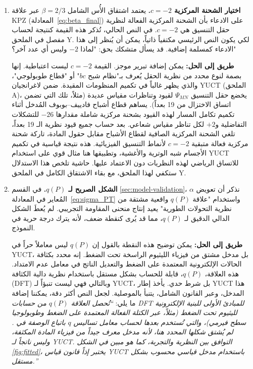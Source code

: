 \documentclass[12pt,a4paper]{article}
\theoremstyle{remark}
\begin{document}
	\begin{enumerate}
		\item \textbf{اختيار الشحنة المركزية \(c = -2\).} يعتمد اشتقاق الأُس الشامل \(\beta = 2/3\) عبر علاقة KPZ (المعادلة~\ref{eq:beta_final}) على الادعاء بأن الشحنة المركزية الفعالة لنظرية حقل التنسيق هي \(c = -2\). في النص الحالي، تُذكر هذه القيمة كنتيجة لحساب مفصل في الملحق Y. لكي يكون النص الرئيسي مكتفياً ذاتياً، يمكن أن يُنظر إلى هذا الادعاء كمسلمة إضافية. قد يسأل متشكك بحق: "لماذا \(-2\) وليس أي عدد آخر؟"
		
		\textbf{طريق إلى الحل:} يمكن إضافة تبرير موجز. القيمة \(c = -2\) ليست اعتباطية. إنها بصمة لنوع محدد من نظرية الحقل يُعرف بـ"نظام شبح \(bc\)" أو "قطاع طوبولوجي"، والذي يظهر غالباً في تكميم المنظومات المقيدة. ضمن لاغرانجيان YUCT (الملحق A)، يخضع حقل التنسيق \(\Psi_{MN}\) لقيود وتناظرات مقياس عديدة (مثلاً، تلك التي تضمن اتساق الاختزال من 19 بعداً). يساهم قطاع أشباح فادييف–بوبوف المُدخل أثناء تكميم تكامل المسار لهذه القيود بشحنة مركزية شاملة مقدارها \(-26\) للتشكلات التفاضلية و\(+2\) لكل تناظر مقياس شعاعي. بعد حساب جميع قيود نظرية الـ 19 بعداً، تلغي الشحنة المركزية الصافية لقطاع الأشباح مقابل حقول المادة، تاركة شحنة مركزية فعالة متبقية \(c = -2\) لأنماط التنسيق الفيزيائية. هذه نتيجة قياسية في تكميم الأجسام شبه الوترية والأغشية، وتطبيقها هنا مثال قوي على استخدام YUCT للاتساق الرياضي لهذه النظريات دون الاعتماد عليها. حاشية تلخص هذا الاستدلال ستكفي لهذا الملحق، مع بقاء الاشتقاق الكامل في الملحق Y.
		
		\item \textbf{الشكل الصريح لـ \(q(P)\).} في القسم \ref{sec:model-validation}، نذكر أن تعويض \(\alpha\) المُعاير في المعادلة~\eqref{eq:sigma_PT} واستخدام "علاقة \(q(P)\) واقعية مشتقة من نظرية التحولات الطورية" يعيد إنتاج منحنى المقاومة التجريبي. لم يُعطَ الشكل الدالي الدقيق لـ \(q(P)\)، مما قد يُرى كنقطة ضعف، لأنه يترك درجة حرية في النموذج.
		
		\textbf{طريق إلى الحل:} يمكن توضيح هذه النقطة بالقول إن \(q(P)\) ليس معاملاً حراً في YUCT، بل مدخل مشتق من فيزياء الليثيوم الراسخة تحت الضغط. إنه محدد بكثافة الحالات الإلكترونية المعتمدة على الضغط والتعديل الناتج في معامل عدم الامتداد. هذه العلاقة، \(q(P)\)، قابلة للحساب بشكل مستقل باستخدام نظرية دالية الكثافة (DFT) وبالتالي فهي ليست تنبؤاً لـ YUCT، بل شرط حدي. يأخذ إطار YUCT هذا المدخل، وعبر القانون الشامل، يتنبأ بالموصلية. لجعل النص أكثر دقة، يمكننا إضافة ما يلي: \textit{``تُحصل العلاقة \(q(P)\) من حسابات DFT للمبادئ الأولى للبنية الإلكترونية لليثيوم تحت الضغط (مثلاً، عبر الكتلة الفعالة المعتمدة على الضغط وطوبولوجيا سطح فيرمي)، والتي تُستخدم بعدها لحساب معامل تساليس \(q\) باتباع الوصفة في \cite{Tsallis2009}. لم يُشتق شكلها المحدد هنا، لأنه مدخل معرف جيداً من فيزياء المادة المكثفة، وليس ناتجاً لـ YUCT. التوافق بين النظرية والتجربة، كما هو مبين في الشكل \ref{fig:fitted}، يختبر إذاً قانون قياس YUCT باستخدام مدخل قياسي محسوب بشكل مستقل.''}
		

\end{enumerate}
\end{document}
